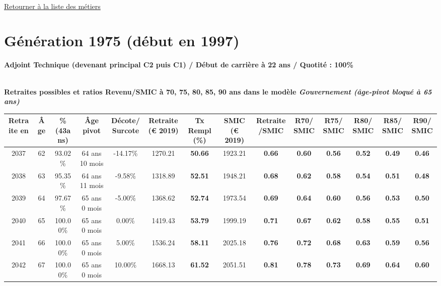 ~\\ 
 
 \hyperlink{page.2}{\noindent Retourner à la liste des métiers}

 \newpage 

\section{Génération 1975 (début en 1997)\label{AdjTech_100_22_1975_0}} 
 
{\bf \noindent Adjoint Technique (devenant principal C2 puis C1) / Début de carrière à 22 ans / Quotité : 100\%}  ~ 

 ~\\{\bf \noindent Retraites possibles et ratios Revenu/SMIC à 70, 75, 80, 85, 90 ans dans le modèle \emph{Gouvernement (âge-pivot bloqué à 65 ans)}}  
 
\begin{adjustbox}{max width=\textwidth} 
\begin{tabular}[htb]{|c|c||c|c|c||c|c||c|c||c|c|c|c|c|} 
\hline 
 Retraite en &  Âge &  \%(43ans) &  Âge pivot &  Décote/Surcote &  Retraite (\euro{} 2019) &  Tx Rempl(\%) &  SMIC (\euro{} 2019) &  Retraite/SMIC &  R70/SMIC &  R75/SMIC &  R80/SMIC &  R85/SMIC &  R90/SMIC \\ 
\hline \hline 
 2037 &  62 &  93.02\% &  64 ans 10 mois &  -14.17\% &  1270.21 &  {\bf 50.66} &  1923.21 &  {\bf {\color{red} 0.66}} &  {\bf {\color{red} 0.60}} &  {\bf {\color{red} 0.56}} &  {\bf {\color{red} 0.52}} &  {\bf {\color{red} 0.49}} &  {\bf {\color{red} 0.46}} \\ 
\hline 
 2038 &  63 &  95.35\% &  64 ans 11 mois &  -9.58\% &  1318.89 &  {\bf 52.51} &  1948.21 &  {\bf {\color{red} 0.68}} &  {\bf {\color{red} 0.62}} &  {\bf {\color{red} 0.58}} &  {\bf {\color{red} 0.54}} &  {\bf {\color{red} 0.51}} &  {\bf {\color{red} 0.48}} \\ 
\hline 
 2039 &  64 &  97.67\% &  65 ans 0 mois &  -5.00\% &  1368.62 &  {\bf 52.74} &  1973.54 &  {\bf {\color{red} 0.69}} &  {\bf {\color{red} 0.64}} &  {\bf {\color{red} 0.60}} &  {\bf {\color{red} 0.56}} &  {\bf {\color{red} 0.53}} &  {\bf {\color{red} 0.50}} \\ 
\hline 
 2040 &  65 &  100.00\% &  65 ans 0 mois &  0.00\% &  1419.43 &  {\bf 53.79} &  1999.19 &  {\bf {\color{red} 0.71}} &  {\bf {\color{red} 0.67}} &  {\bf {\color{red} 0.62}} &  {\bf {\color{red} 0.58}} &  {\bf {\color{red} 0.55}} &  {\bf {\color{red} 0.51}} \\ 
\hline 
 2041 &  66 &  100.00\% &  65 ans 0 mois &  5.00\% &  1536.24 &  {\bf 58.11} &  2025.18 &  {\bf {\color{red} 0.76}} &  {\bf {\color{red} 0.72}} &  {\bf {\color{red} 0.68}} &  {\bf {\color{red} 0.63}} &  {\bf {\color{red} 0.59}} &  {\bf {\color{red} 0.56}} \\ 
\hline 
 2042 &  67 &  100.00\% &  65 ans 0 mois &  10.00\% &  1668.13 &  {\bf 61.52} &  2051.51 &  {\bf {\color{red} 0.81}} &  {\bf {\color{red} 0.78}} &  {\bf {\color{red} 0.73}} &  {\bf {\color{red} 0.69}} &  {\bf {\color{red} 0.64}} &  {\bf {\color{red} 0.60}} \\ 
\hline 
\hline 
\end{tabular} 
\end{adjustbox} 
 
